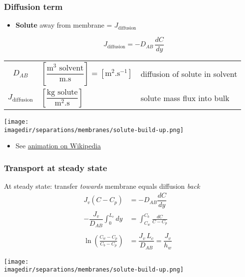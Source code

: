 \begin{frame}\frametitle{Diffusion term}
	\begin{itemize}
		\item	\textbf{Solute} {\color{purple}{diffusion}} away from membrane = $J_\text{diffusion}$
		\begin{exampleblock}{}
			\[
				J_\text{diffusion} = -D_{AB} \,\frac{dC}{dy}
			\]
		\end{exampleblock}
	\end{itemize}

	\begin{tabular}{cll}
		$D_{AB}$				&	$\left[\dfrac{\text{m}^3 \text{~solvent}}{\text{m.s}}\right] = \left[\text{m}^2\text{.s}^{-1}\right]$	& diffusion of solute in solvent \\
		$J_\text{diffusion}$ 	&  	$\left[\dfrac{\text{kg solute}}{\text{m}^2 \text{.s}}\right]$	& solute mass flux into bulk\\
	\end{tabular}
	\begin{center}
		\texttt{[image: \\imagedir/separations/membranes/solute-build-up.png]}
	\end{center}
	\vspace{-6pt}
	\begin{itemize}
		\item	See \href{http://en.wikipedia.org/wiki/File:DiffusionMicroMacro.gif}{animation on Wikipedia}
	\end{itemize}
\end{frame}

\begin{frame}\frametitle{Transport at steady state}
	At steady state: transfer \emph{\color{myOrange}towards} membrane equals diffusion \emph{\color{myOrange}back}
	\[
		\begin{array}{rl}
		 	J_v(C - C_p)  &= -D_{AB} \dfrac{dC}{dy} \\
			-\dfrac{J_v}{D_{AB}} \displaystyle \int_{0}^{L_c}{dy} &= \displaystyle \int_{C_w}^{C_b}{\frac{dC}{C-C_p}} \\ \\
			\displaystyle\ln\left(\frac{C_w - C_p}{C_b - C_p}\right) &= \dfrac{J_v \,L_c}{D_{AB}} = \dfrac{J_v}{h_w}
		\end{array}
	\]
	\vspace{6pt}
	\begin{center}
		\texttt{[image: \\imagedir/separations/membranes/solute-build-up.png]}
	\end{center}
\end{frame}

